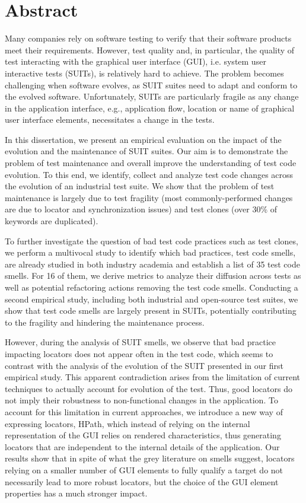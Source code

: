   \chapter*{Abstract}

Many companies rely on software testing to verify that their software products meet their requirements. However, test quality and, in particular, the quality of test interacting with the graphical user interface (GUI), i.e. system user interactive tests (SUITs), is relatively hard to achieve. The problem becomes challenging when software evolves, as SUIT suites need to adapt and conform to the evolved software. Unfortunately, SUITs are particularly fragile as any change in the application interface, e.g., application flow, location or name of graphical user interface elements, necessitates a change in the tests. 

In this dissertation, we present an empirical evaluation on the impact of the evolution and the maintenance of SUIT suites. Our aim is to demonstrate the problem of test maintenance and overall improve the understanding of test code evolution. To this end, we identify, collect and analyze test code changes across the evolution of an industrial test suite. We show that the problem of test maintenance is largely due to test fragility (most commonly-performed changes are due to locator and synchronization issues) and test clones (over 30\% of keywords are duplicated). 

To further investigate the question of bad test code practices such as test clones, we perform a multivocal study to identify which bad practices, test code smells, are already studied in both industry academia and establish a list of 35 test code smells. For 16 of them, we derive metrics to analyze their diffusion across tests as well as potential refactoring actions removing the test code smells. Conducting a second empirical study, including both industrial and open-source test suites, we show that test code smells are largely present in SUITs, potentially contributing to the fragility and hindering the maintenance process.

However, during the analysis of SUIT smells, we observe that bad practice impacting locators does not appear often in the test code, which seems to contrast with the analysis of the evolution of the SUIT presented in our first empirical study.  This apparent contradiction arises from the limitation of current techniques to actually account for evolution of the test. Thus, good locators do not imply their robustness to non-functional changes in the application. To account for this limitation in current approaches, we introduce a new way of expressing locators, HPath, which instead of relying on the internal representation of the GUI relies on rendered characteristics, thus generating locators that are independent to the internal details of the application. Our results show that in spite of what the grey literature on smells suggest, locators relying on a smaller number of GUI elements to fully qualify a target do not necessarily lead to more robust locators, but the choice of the GUI element properties has a much stronger impact.
